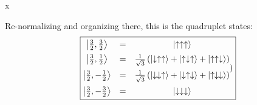 x\documentclass[12pt]{article}
\begin{document}
\begin{enumerate}[label=\alph*)]
Re-normalizing and organizing there, this is the quadruplet states: 
\[\boxed{\mqty{\ket{\frac{3}{2}, \frac{3}{2}} & = & \ket{\uparrow\uparrow\uparrow}\vspace{0.5em}\\ \ket{\frac{3}{2}, \frac{1}{2}} & = & \frac{1}{\sqrt{3}}\left(\ket{\downarrow\uparrow\uparrow} + \ket{\uparrow\downarrow\uparrow} + \ket{\uparrow\uparrow\downarrow}\right)\vspace{0.5em}\\ \ket{\frac{3}{2}, -\frac{1}{2}} & = & \frac{1}{\sqrt{3}}\left(\ket{\downarrow\downarrow\uparrow} + \ket{\downarrow\uparrow\downarrow} + \ket{\uparrow\downarrow\downarrow}\right)\vspace{0.5em}\\ \ket{\frac{3}{2}, -\frac{3}{2}} & = & \ket{\downarrow\downarrow\downarrow}})}\]


\end{enumerate}
\end{document}
